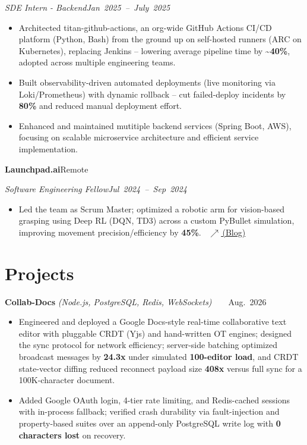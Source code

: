 \documentclass[10pt,letterpaper]{article}
\newcommand{\resumeHeading}[4]{%
  \par\noindent\textbf{#1}\hfill\mbox{#2}\par
  \noindent\textit{#3}\hfill\mbox{\textit{#4}}\par
}
\newcommand{\projectHeading}[3]{%
  \par\noindent\textbf{#1} \textit{(#2)}\hfill\mbox{#3}\par
}
\begin{document}
\noindent\textit{SDE Intern - Backend}\hfill\mbox{\textit{Jan 2025 -- July 2025}}\par
\begin{itemize}
\item Architected titan-github-actions, an org-wide GitHub Actions CI/CD platform (Python, Bash) from the ground up on self-hosted runners (ARC on Kubernetes), replacing Jenkins -- lowering average pipeline time by \textbf{\textasciitilde 40\%}, adopted across multiple engineering teams.
\item Built observability-driven automated deployments (live monitoring via Loki/Prometheus) with dynamic rollback -- cut failed-deploy incidents by \textbf{80\%} and reduced manual deployment effort.
\item Enhanced and maintained mutitiple backend services (Spring Boot, AWS), focusing on scalable microservice architecture and efficient service implementation.
\end{itemize}

\resumeHeading{Launchpad.ai}{Remote}{Software Engineering Fellow}{Jul 2024 -- Sep 2024}
\begin{itemize}
\item Led the team as Scrum Master; optimized a robotic arm for vision-based grasping using Deep RL (DQN, TD3) across a custom PyBullet simulation, improving movement precision/efficiency by \textbf{45\%}. \textbar\ \href{https://medium.com/@gauthamsathyan/automating-sunscreen-application-with-robotics-a-deep-dive-into-two-approaches-34304dbdd719}{\textnormal{\scriptsize$\nearrow$\,\normalsize (Blog)}}
\end{itemize}

\section{Projects}
\projectHeading{Collab-Docs}{Node.js, PostgreSQL, Redis, WebSockets}{\scriptsize\href{https://github.com/dreddak47/collab-docs}{\faGithub}\ \textbar\ \href{https://collab-client-kvn5.onrender.com/}{\faExternalLink}\ \textbar\ \normalsize Aug. 2026}
\begin{itemize}
  \item Engineered and deployed a Google Docs-style real-time collaborative text editor with pluggable CRDT (Yjs) and hand-written OT engines; designed the sync protocol for network efficiency; server-side batching optimized broadcast messages by \textbf{24.3x} under simulated \textbf{100-editor load}, and CRDT state-vector diffing reduced reconnect payload size \textbf{408x} versus full sync for a 100K-character document.
  \item Added Google OAuth login, 4-tier rate limiting, and Redis-cached sessions with in-process fallback; verified crash durability via fault-injection and property-based suites over an append-only PostgreSQL write log with \textbf{0 characters lost} on recovery.
\end{itemize}
\end{document}
